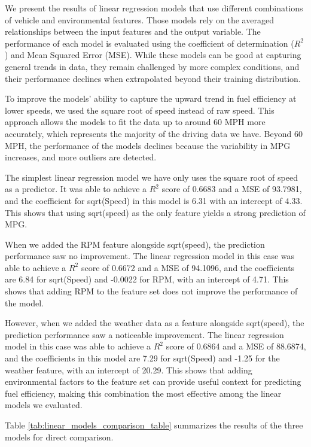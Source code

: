 \documentclass[letterpaper]{article}
\begin{document}
We present the results of linear regression models that use different 
combinations of vehicle and environmental features. Those models rely on 
the averaged relationships between the input features and the output 
variable. The performance of each model is evaluated using the coefficient 
of determination ($R^2$) and Mean Squared Error (MSE). While these models 
can be good at capturing general trends in data, they remain challenged by 
more complex conditions, and their performance declines when extrapolated 
beyond their training distribution.

To improve the models' ability to capture the upward trend in fuel 
efficiency at lower speeds, we used the square root of speed instead of 
raw speed. This approach allows the models to fit the data up to around 
60 MPH more accurately, which represents the majority of the driving data 
we have. Beyond 60 MPH, the performance of the models declines because the 
variability in MPG increases, and more outliers are detected.

The simplest linear regression model we have only uses the square root of 
speed as a predictor. It was able to achieve a $R^2$ score of 0.6683 and a 
MSE of 93.7981, and the coefficient for sqrt(Speed) in this model is 6.31 
with an intercept of 4.33. This shows that using sqrt(speed) as the only 
feature yields a strong prediction of MPG.

When we added the RPM feature alongside sqrt(speed), the prediction 
performance saw no improvement. The linear regression model in this case 
was able to achieve a $R^2$ score of 0.6672 and a MSE of 94.1096, and the 
coefficients are 6.84 for sqrt(Speed) and -0.0022 for RPM, with an 
intercept of 4.71. This shows that adding RPM to the feature set does not 
improve the performance of the model.

However, when we added the weather data as a feature alongside sqrt(speed), 
the prediction performance saw a noticeable improvement. The linear 
regression model in this case was able to achieve a $R^2$ score of 0.6864 
and a MSE of 88.6874, and the coefficients in this model are 7.29 for 
sqrt(Speed) and -1.25 for the weather feature, with an intercept of 20.29. 
This shows that adding environmental factors to the feature set can 
provide useful context for predicting fuel efficiency, making this 
combination the most effective among the linear models we evaluated.

Table \ref{tab:linear_models_comparison_table} summarizes the results of the 
three models for direct comparison.
\end{document}

